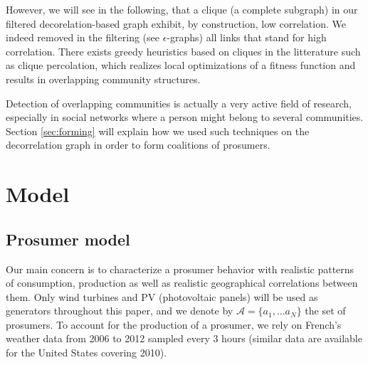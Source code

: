 \documentclass[conference]{IEEEtran}
\begin{document}
However, we will see in the following, that a clique (a complete subgraph) in our filtered decorelation-based graph exhibit, by construction, low correlation. We indeed removed in the filtering (see $\epsilon$-graphs) all links that stand for high correlation. There exists greedy heuristics based on cliques in the litterature such as clique percolation, \cite{Lancichinetti} which realizes local optimizations of a fitness function and results in overlapping community structures. 

Detection of overlapping communities is actually a very active field of research, especially in social networks where a person might belong to several communities. Section \ref{sec:forming} will explain how we used such techniques on the decorrelation graph in order to form coalitions of prosumers.


%
%

\section{Model}
\label{sec:model}
\subsection{Prosumer model}\label{subsec:ProsumerModel}

Our main concern is to characterize a prosumer behavior with realistic patterns of consumption, production as well as realistic geographical correlations between them. Only wind turbines and PV (photovoltaic panels) will be used as generators throughout this paper, and we denote by $ \mathcal{A} = \{ a_{1},...a_{N} \} $ the set of prosumers. To account for the production of a prosumer, we rely on French's weather data from 2006 to 2012 sampled every 3 hours \cite{Infoclimat} (similar data are available for the United States covering 2010\cite{NCDC}). 
\end{document}
